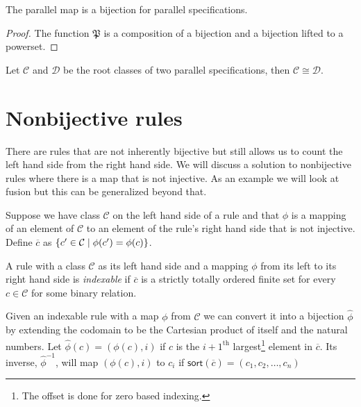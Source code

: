 \begin{proposition}
The parallel map is a bijection for parallel specifications.
\end{proposition}
\begin{proof}
The function $\mathfrak{P}$ is a composition of a bijection and a bijection lifted to a powerset.
\end{proof}
\begin{corollary}
Let $\mathcal{C}$ and $\mathcal{D}$ be the root classes of two parallel specifications, then $\mathcal{C} \cong \mathcal{D}$.
\end{corollary}

\section{Nonbijective rules}
There are rules that are not inherently bijective but still allows us to count the left hand side from the right hand side. We will discuss a solution to nonbijective rules where there is a map that is not injective. As an example we will look at fusion but this can be generalized beyond that.

Suppose we have class $\mathcal{C}$ on the left hand side of a rule and that $\phi$ is a mapping of an element of $\mathcal{C}$ to an element of the rule's right hand side that is not injective. Define $\overline{c}$ as $\left\{c' \in \mathcal{C} \mid \phi(c') = \phi(c)\right\}$. 

\begin{definition}
A rule with a class $\mathcal{C}$ as its left hand side and a mapping $\phi$ from its left to its right hand side is \emph{indexable} if $\overline{c}$ is a strictly totally ordered finite set for every $c \in \mathcal{C}$ for some binary relation.
\end{definition}

Given an indexable rule with a map $\phi$ from $\mathcal{C}$ we can convert it into a bijection 
$\hat{\phi}$ by extending the codomain to be the Cartesian product of itself and the natural numbers. Let $\hat{\phi}(c) = (\phi(c),i)$ if $c$ is the $i+1^\text{th}$ largest\footnote{The offset is done for zero based indexing.} element in $\overline{c}$. Its inverse, $\hat{\phi}^{-1}$, will map $(\phi(c),i)$ to $c_i$ if $\textsf{sort}(\overline{c}) = (c_1,c_2,\dotsc,c_n)$

